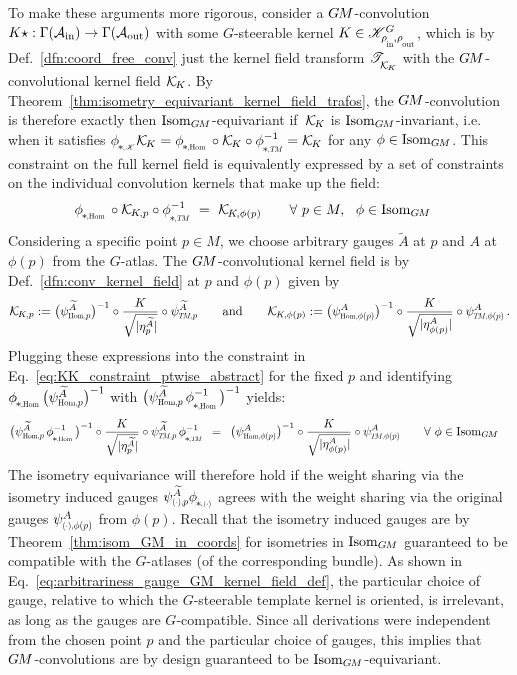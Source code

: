 To make these arguments more rigorous, consider a $G\mkern-1.4muM$-convolution $K\star: \Gamma(\mathcal{A}_\textup{in}) \to \Gamma(\mathcal{A}_\textup{out})$ with some $G$-steerable kernel $K \in \KG$, which is by Def.~\ref{dfn:coord_free_conv} just the kernel field transform $\mathscr{T}_{\overset{}{\mkern-0mu \mathcal{K}_{\mkern-2mu K}}}$ with the $G\mkern-1.4muM$-convolutional kernel field $\mathcal{K}_{\mkern-2mu K}$.
By Theorem~\ref{thm:isometry_equivariant_kernel_field_trafos}, the $G\mkern-1.4muM$-convolution is therefore exactly then $\operatorname{Isom}_{G\mkern-1.4muM}$-equivariant if~$\mathcal{K}_{\mkern-2mu K}$ is $\operatorname{Isom}_{G\mkern-1.4muM}$-invariant, i.e. when it satisfies $\dphiK \KK = \dphiHom \circ \KK \circ \dphiTMinv = \KK$ for any $\phi \in \operatorname{Isom}_{G\mkern-1.4muM}$.
This constraint on the full kernel field is equivalently expressed by a set of constraints on the individual convolution kernels that make up the field:
\begin{align}\label{eq:KK_constraint_ptwise_abstract}
    \dphiHom \circ \KKp \circ \dphiTMinv \ &=\ \KKphip \qquad \forall\ p\in M,\ \ \phi \in \IsomGM
\end{align}
Considering a specific point $p\in M$, we choose arbitrary gauges $\widetilde{A}$ at $p$ and $A$ at $\phi(p)$ from the $G$-atlas.
The $G\mkern-1.4muM$-convolutional kernel field is by Def.~\ref{dfn:conv_kernel_field} at $p$ and $\phi(p)$ given by
\begin{align}
    \KKp    := \big(\psiHomp^{\widetilde{A}} \big)^{-1} \circ \frac{K}{\sqrt{|\eta_p^{\widetilde{A}}|}} \circ \psiTMp^{\widetilde{A}}
    \qquad \textup{and} \qquad
    \KKphip := \big(\psiHomphip^A            \big)^{-1} \circ \frac{K}{\sqrt{|\eta_{\phi(p)}^A|}}       \circ \psiTMphip^A \,.
\end{align}
Plugging these expressions into the constraint in Eq.~\eqref{eq:KK_constraint_ptwise_abstract} for the fixed $p$ and identifying $\dphiHom \big(\psiHomp^{\widetilde{A}} \big)^{-1}$ with $\big( \psiHomp^{\widetilde{A}}\, \dphiHom^{-1}  \big)^{-1}$ yields:
\begin{align}\label{eq:GM-conv_kernel_field_isom_invariance_1}
    \big( \psiHomp^{\widetilde{A}}\, \dphiHom^{-1}  \big)^{-1} \circ \frac{K}{\sqrt{|\eta_p^{\widetilde{A}}|}} \circ \psiTMp^{\widetilde{A}}\, \dphiTMinv
    \,\ &=\,\ \big(\psiHomphip^A \big)^{-1} \circ \frac{K}{\sqrt{|\eta_{\phi(p)}^A|}} \circ \psiTMphip^A
    \qquad \forall\ \phi \in \IsomGM
\end{align}
The isometry equivariance will therefore hold if the weight sharing via the isometry induced gauges $\psidotp^{\widetilde{A}} \dphidot$ agrees with the weight sharing via the original gauges $\psidotphip^A$ from $\phi(p)$.
Recall that the isometry induced gauges are by Theorem~\ref{thm:isom_GM_in_coords} for isometries in $\operatorname{Isom}_{G\mkern-1.4muM}$ guaranteed to be compatible with the $G$-atlases (of the corresponding bundle).
As shown in Eq.~\eqref{eq:arbitrariness_gauge_GM_kernel_field_def}, the particular choice of gauge, relative to which the $G$-steerable template kernel is oriented, is irrelevant, as long as the gauges are $G$-compatible.
Since all derivations were independent from the chosen point $p$ and the particular choice of gauges, this implies that $G\mkern-1.4muM$-convolutions are by design guaranteed to be $\operatorname{Isom}_{G\mkern-1.4muM}$-equivariant.


